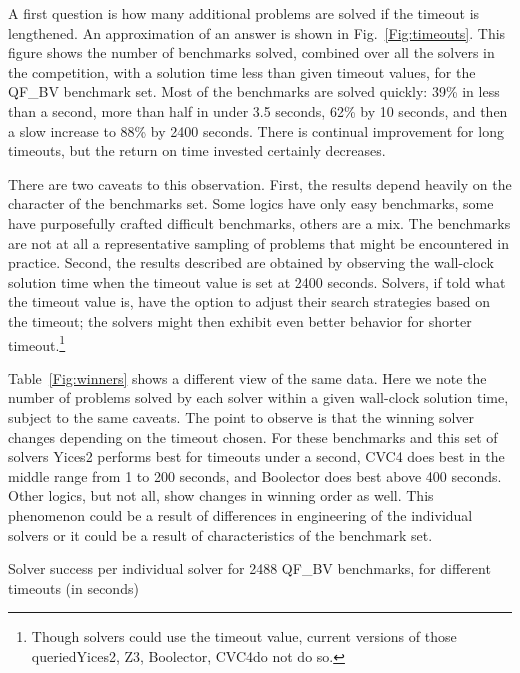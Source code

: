 \documentclass[twoside,11pt]{article}
\begin{document}
A first question is how many additional problems are solved if the timeout is lengthened. An approximation
of an answer is shown in Fig.~\ref{Fig:timeouts}. This figure shows the number of benchmarks solved,  combined over all the solvers in the competition, with a solution time less than given timeout values, for the QF\_BV benchmark set.
Most of the benchmarks are solved quickly: 39\% in less than a second, more than half in under 3.5 seconds, 
62\% by 10 seconds, and then a slow increase to 88\% by 2400 seconds. There is continual improvement for long timeouts, but the return on time invested certainly decreases. 

There are two caveats to this observation. First, the results depend heavily on the character of the benchmarks set. Some logics have only easy benchmarks, some have purposefully crafted difficult benchmarks, others are a mix. The benchmarks are not at all a representative sampling of problems that might be encountered in practice.  Second, the results described are obtained by observing the wall-clock solution time when the timeout value is set at 2400 seconds. Solvers, if told what the timeout value is, have the option to adjust their search strategies based on the timeout; the solvers might then exhibit even better behavior for shorter timeout.\footnote{Though solvers could use the timeout value, current versions of those queried\textemdash Yices2, Z3, Boolector, CVC4\textemdash do not do so.}

Table~\ref{Fig:winners} shows a different view of the same data. Here we note the number of problems solved by each solver within a given wall-clock solution time, subject to the same caveats. The point to observe is that the winning solver changes depending on the timeout chosen. For these benchmarks and this set of solvers Yices2 performs best for timeouts under a second, CVC4 does best in the middle range from 1 to 200 seconds, and Boolector does best above 400 seconds. Other logics, but not all, show changes in winning order as well. This phenomenon could be a result of differences in engineering of the individual solvers or it could be a result of characteristics of the benchmark set.



%

\begin{table}
\centering

\caption{Solver success per individual solver for 2488 QF\_BV benchmarks, for different timeouts (in seconds)}
\label{Fig:winners}
\end{table}
\end{document}
